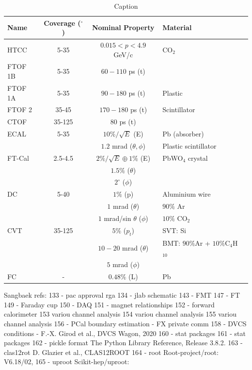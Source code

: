 \begin{table}[ht]
    \centering
    \begin{tabularx}{\textwidth}{XccXX}
    \toprule
    Name & Coverage ($^\circ$) & Nominal Property & Material \\
    \midrule
    HTCC & 5-35 & $0.015 < p < 4.9$ GeV/c & CO$_2$ \\
    FTOF 1B & 5-35 & $60 - 110$ ps (t) & \\
    FTOF 1A & 5-35 & $90 - 180$ ps (t) & Plastic \\
    FTOF 2 & 35-45 & $170 - 180$ ps (t) & Scintillator \\
    CTOF & 35-125 & $80$ ps (t) & \\
    ECAL & 5-35 & $10\%/\sqrt{E}$ (E) & Pb (absorber) \\
    & & $1.2$ mrad ($\theta, \phi$) & Plastic scintillator \\
    FT-Cal & 2.5-4.5 & $2\%/\sqrt{E} \oplus 1\%$ (E) & PbWO$_4$ crystal \\
    & & $1.5\%$ ($\theta$) & \\
    & & $2^\circ$ ($\phi$) & \\
    DC & 5-40 & $1\%$ (p) & Aluminium wire \\
    & & $1$ mrad ($\theta$) & $90\%$ Ar \\
    & & $1$ mrad/sin $\theta$ ($\phi$) & $10\%$ CO$_2$ \\
    CVT & 35-125 & $5\%$ ($p_t$) & SVT: Si \\
    & & $10 - 20$ mrad ($\theta$) & BMT: $90\%$Ar + $10\%$C$_4$H$_{10}$ \\
    & & $5$ mrad ($\phi$) & \\
    FC & - & $0.48\%$ (L) & Pb \\
    \bottomrule
    \end{tabularx}
    \caption{Caption}
    \label{tab:my_label}
\end{table}


Sangbaek refs:
133 - pac approval rga 
134 - jlab schematic 
143 - FMT 
147 - FT 
149 - Faraday cup 
150 - DAQ 
151 - magnet relationships
152 - forward calorimeter 
153 variou channel analysis
154 variou channel analysis
155 variou channel analysis
156 - PCal boundary estimation - FX private comm
158 - DVCS conditions - F.-X. Girod et al., DVCS Wagon, 2020
160 - stat packages
161 - stat packages
162 - pickle format The Python Library Reference, Release 3.8.2.
163 - clas12rot D. Glazier et al., CLAS12ROOT
164 - root Root-project/root: V6.18/02,
165 - uproot Scikit-hep/uproot:











\cleardoublepage






